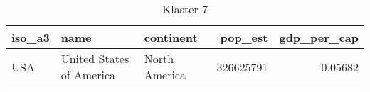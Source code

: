 \begin{table}[h!]
   \centering
   \caption{Klaster 7}
   \label{tab:cl7}
   \begin{tabular}{lllrr}
      \toprule
      iso\_a3 & name                     & continent     & pop\_est  & gdp\_per\_cap \\
      \midrule
      USA     & United States of America & North America & 326625791 & 0.05682       \\
      \bottomrule
   \end{tabular}
\end{table}
